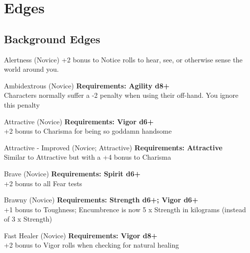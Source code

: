 
\section{Edges}

\begin{multicols}{2}

%
%
\subsection{Background Edges}

\begin{genericsection}{Alertness (Novice)}
+2 bonus to Notice rolls to hear, see, or otherwise sense the world around you.
\end{genericsection}

\begin{genericsection}{Ambidextrous (Novice)}
\textbf{Requirements: Agility d8+}\\
Characters normally suffer a -2 penalty when using their off-hand. You ignore this penalty
\end{genericsection}

\begin{genericsection}{Attractive (Novice)}
\textbf{Requirements: Vigor d6+}\\
+2 bonus to Charisma for being so goddamn handsome
\end{genericsection}

\begin{genericsection}{Attractive - Improved (Novice; Attractive)}
\textbf{Requirements: Attractive}\\
Similar to Attractive but with a +4 bonus to Charisma
\end{genericsection}

\begin{genericsection}{Brave (Novice)}
\textbf{Requirements: Spirit d6+}\\
+2 bonus to all Fear tests
\end{genericsection}

\begin{genericsection}{Brawny (Novice)}
\textbf{Requirements: Strength d6+; Vigor d6+}\\
+1 bonus to Toughness; Encumbrence is now 5 x Strength in kilograms (instead of 3 x Strength)
\end{genericsection}

\begin{genericsection}{Fast Healer (Novice)}
\textbf{Requirements: Vigor d8+}\\
+2 bonus to Vigor rolls when checking for natural healing
\end{genericsection}


\end{multicols}
